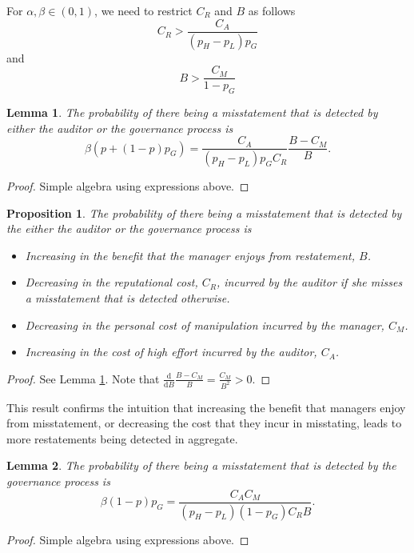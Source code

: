 \documentclass[11pt]{amsart}
\newtheorem{lemma}{Lemma}
\newtheorem{proposition}[theorem]{Proposition}
\begin{document}
For $\alpha, \beta \in (0, 1)$, we need to restrict $C_R$ and $B$ as follows
\[  C_R > \frac{C_A}{(p_H-p_L)p_G} \]
and 
\[  B > \frac{C_M}{1 - p_G}  \]

\begin{lemma}\label{prob_total}
The probability of there being a misstatement that is detected by either the auditor or the governance process is 
\[ \beta \left( p + (1-p)  p_G \right) = \frac{C_A}{(p_H-p_L) p_G C_R } \frac{B- C_M}{B}. \]
\end{lemma}
\begin{proof}
Simple algebra using expressions above.
\end{proof}

\begin{proposition}
The probability of there being a misstatement that is detected by the either the auditor or the governance process is 
\begin{itemize}
\item Increasing in the benefit that the manager enjoys from restatement, $B$.
\item Decreasing in the reputational cost, $C_R$, incurred by the auditor if she misses a misstatement that is detected otherwise.
\item Decreasing in the personal cost of manipulation incurred by the manager, $C_M$.
\item Increasing in the cost of high effort incurred by the auditor, $C_A$.
\end{itemize}
\end{proposition}

\begin{proof}
See Lemma \ref{prob_total}. 
Note that $\frac{\mathrm{d}}{\mathrm{d}B} \frac{B- C_M}{B} = \frac{C_M}{B^2} >0.$
\end{proof}

This result confirms the intuition that increasing the benefit that managers enjoy from misstatement, or decreasing the cost that they incur in misstating, leads to more restatements being detected in aggregate.

\begin{lemma}\label{prob_observed}
The probability of there being a misstatement that is detected by the governance process is 
\[ \beta  (1-p)  p_G = \frac{C_A C_M}{(p_H-p_L) (1 - p_G) C_R  B}. \]
\end{lemma}
\begin{proof}
Simple algebra using expressions above.
\end{proof}
\end{document}
